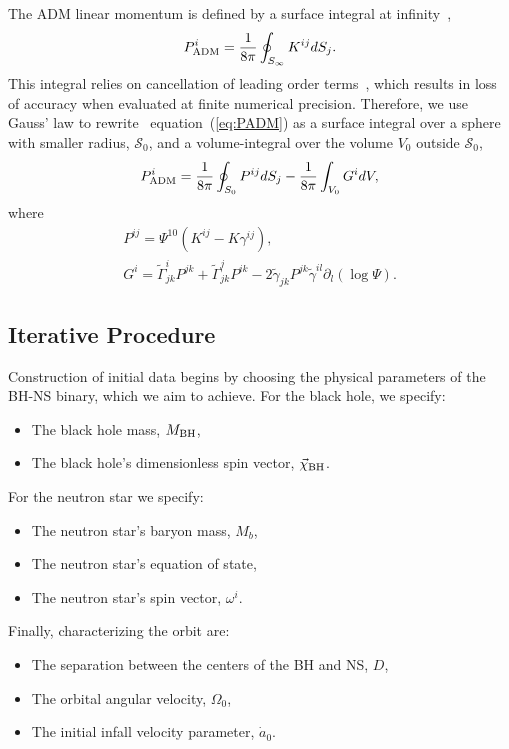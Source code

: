 The ADM linear momentum is defined by a surface integral at infinity~\citep{ADM,York:1979},
\begin{equation}\label{eq:PADM}
P_{\rm ADM}^i = \frac{1}{8\pi}\oint_{S_{\infty}}K^{ij}dS_j.
\end{equation}
This integral relies on cancellation of leading order terms~\citep{FoucartEtAl:2008,Ossokine:2015yla}, which
results in loss of accuracy when evaluated at finite numerical
precision. Therefore, we use Gauss' law to rewrite~\citep{FoucartEtAl:2008,Ossokine:2015yla}
equation~(\ref{eq:PADM}) as a surface integral over a sphere with
smaller radius, $\mathcal{S}_0$, and a volume-integral over the volume
$V_0$ outside $\mathcal{S}_0$, 
\begin{equation}\label{eq:PADM2}
P_{\rm ADM}^i = \frac{1}{8\pi}\oint_{S_0}P^{ij}dS_j-\frac{1}{8\pi}\int_{V_0}G^idV,
\end{equation}
where
\begin{eqnarray}
P^{ij}=\Psi^{10}\left(K^{ij}-K\gamma^{ij}\right),\\
G^i=\tilde{\Gamma}^i_{jk}P^{jk}+\tilde{\Gamma}^j_{jk}P^{ik}-2\tilde{\gamma}_{jk}P^{jk}\tilde{\gamma}^{il}\partial_l\left(\log\Psi\right).
\end{eqnarray}


\subsection{Iterative Procedure}

Construction of initial data begins by choosing the physical
parameters of the BH-NS binary, which we aim to achieve.
For the black hole, we specify:
\begin{itemize}
\item The black hole mass, $M_{\rm BH}$,
\item The black hole's dimensionless spin vector,
  $\vec{\chi}_{\rm BH}$.
\end{itemize}
For the neutron star we specify:
\begin{itemize}
\item The neutron star's baryon mass, $M_{b}$,
\item The neutron star's equation of state, 
\item The neutron star's spin vector, $\omega^i$.
\end{itemize}
Finally, characterizing the orbit are:
\begin{itemize}
\item The separation between the centers of the BH and NS, $D$,
\item The orbital angular velocity, $\Omega_0$,
\item The initial infall velocity parameter, $\dot{a}_0$.
\end{itemize}

